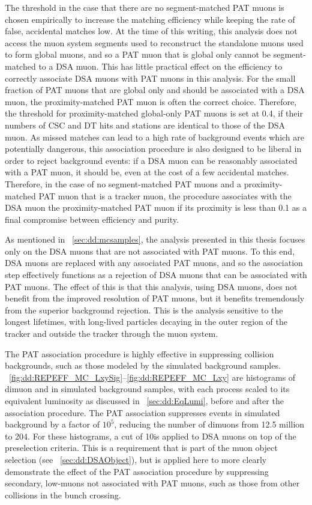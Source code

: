The \deltaR threshold in the case that there are no segment-matched PAT muons is chosen empirically to increase the matching efficiency while keeping the rate of false, accidental matches low.
At the time of this writing, this analysis does not access the muon system segments used to reconstruct the standalone muons used to form global muons, and so a PAT muon that is global only cannot be segment-matched to a DSA muon.
This has little practical effect on the efficiency to correctly associate DSA muons with PAT muons in this analysis.
For the small fraction of PAT muons that are global only and should be associated with a DSA muon, the proximity-matched PAT muon is often the correct choice.
Therefore, the \deltaR threshold for proximity-matched global-only PAT muons is set at 0.4, if their numbers of CSC and DT hits and stations are identical to those of the DSA muon.
As missed matches can lead to a high rate of background events which are potentially dangerous, this association procedure is also designed to be liberal in order to reject background events: if a DSA muon can be reasonably associated with a PAT muon, it should be, even at the cost of a few accidental matches.
Therefore, in the case of no segment-matched PAT muons and a proximity-matched PAT muon that is a tracker muon, the procedure associates with the DSA muon the proximity-matched PAT muon if its proximity \deltaR is less than 0.1 as a final compromise between efficiency and purity.

As mentioned in \Sec~\ref{sec:dd:mcsamples}, the analysis presented in this thesis focuses only on the DSA muons that are not associated with PAT muons.
To this end, DSA muons are replaced with any associated PAT muons, and so the association step effectively functions as a rejection of DSA muons that can be associated with PAT muons.
The effect of this is that this analysis, using DSA muons, does not benefit from the improved resolution of PAT muons, but it benefits tremendously from the superior background rejection.
This is the analysis sensitive to the longest lifetimes, with long-lived particles decaying in the outer region of the tracker and outside the tracker through the muon system.

The PAT association procedure is highly effective in suppressing \pp collision backgrounds, such as those modeled by the simulated background samples.
\Figs~\ref{fig:dd:REPEFF_MC_LxySig}--\ref{fig:dd:REPEFF_MC_Lxy} are histograms of dimuon \LxySig and \Lxy in simulated background samples, with each process scaled to its equivalent luminosity as discussed in \Sec~\ref{sec:dd:EqLumi}, before and after the association procedure.
The PAT association suppresses events in simulated background by a factor of $10^5$, reducing the number of dimuons from 12.5 million to 204.
For these histograms, a \pT cut of 10\GeV is applied to DSA muons on top of the preselection criteria.
This is a requirement that is part of the muon object selection (see \Sec~\ref{sec:dd:DSAObject}), but is applied here to more clearly demonstrate the effect of the PAT association procedure by suppressing secondary, low-\pT muons not associated with PAT muons, such as those from other \pp collisions in the bunch crossing.

